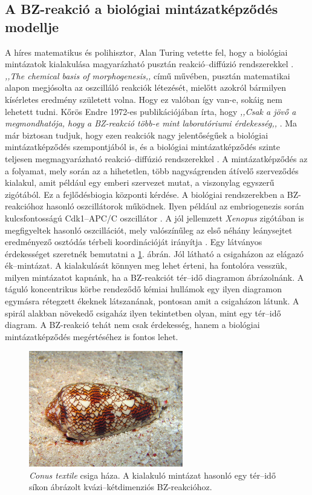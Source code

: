 \subsection{A BZ-reakció a biológiai mintázatképződés modellje}

A híres matematikus és polihisztor, Alan Turing vetette fel, hogy a biológiai mintázatok kialakulása magyarázható pusztán reakció--diffúzió rendszerekkel \cite{turing1952chemical}. \emph{,,The chemical basis of morphogenesis,,} című művében, pusztán matematikai alapon megjósolta az oszcilláló reakciók létezését, mielőtt azokról bármilyen kísérletes eredmény született volna. Hogy ez valóban így van-e, sokáig nem lehetett tudni. Kőrös Endre 1972-es publikációjában írta, hogy \emph{,,Csak a jövő a megmondhatója, hogy a BZ-reakció több-e mint laboratóriumi érdekesség,,} \cite{field1972oscillations}. Ma már biztosan tudjuk, hogy ezen reakciók nagy jelentőségűek a biológiai mintázatképződés szempontjából is, és a biológiai mintázatképződés szinte teljesen megmagyarázható reakció--diffúzió rendszerekkel \cite{kondo2010reaction}. A mintázatképződés az a folyamat, mely során az a hihetetlen, több nagyságrenden átívelő szerveződés kialakul, amit például egy emberi szervezet mutat, a viszonylag egyszerű zigótából. Ez a fejlődésbiogia központi kérdése. A biológiai rendszerekben a BZ-reakcióhoz hasonló oszcillátorok működnek. Ilyen például az embriogenezis során kulcsfontosságú Cdk1--APC/C oszcillátor \cite{yang2013cdk1}. A jól jellemzett \emph{Xenopus} zigótában is megfigyeltek hasonló oszcillációt, mely valószínűleg az első néhány leánysejtet eredményező osztódás térbeli koordinációját irányítja \cite{chang2013mitotic}. Egy látványos érdekességet szeretnék bemutatni a \ref{fig:csiga}. ábrán. Jól látható a csigaházon az elágazó ék--mintázat. A kialakulását könnyen meg lehet érteni, ha fontolóra vesszük, milyen mintázatot kapnánk, ha a BZ-reakciót tér--idő diagramon ábrázolnánk. A táguló koncentrikus körbe rendeződő kémiai hullámok egy ilyen diagramon egymásra rétegzett ékeknek látszanának, pontosan amit a csigaházon látunk. A spirál alakban növekedő csigaház ilyen tekintetben olyan, mint egy tér--idő diagram. A BZ-reakció tehát nem csak érdekesség, hanem a biológiai mintázatképződés megértéséhez is fontos lehet.

\begin{figure}[!h]
\centering
\includegraphics[width=0.6\textwidth]{img/conus.jpg}
\caption{\emph{Conus textile} csiga háza. A kialakuló mintázat hasonló egy tér--idő síkon ábrázolt kvázi--kétdimenziós BZ-reakcióhoz.}
\label{fig:csiga}
\end{figure}
